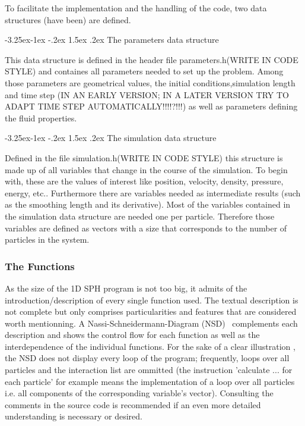 \documentclass{report}
\makeatletter
\renewcommand\paragraph{\@startsection{paragraph}{4}{\z@}%
  {-3.25ex\@plus -1ex \@minus -.2ex}%
  {1.5ex \@plus .2ex}%
  {\normalfont\normalsize\bfseries}}
\makeatother
\begin{document}
To facilitate the implementation and the handling of the code, two data structures (have been) are defined. 

\paragraph{The parameters data structure}

This data structure is defined in the header file parameters.h(WRITE IN CODE STYLE) and containes all parameters needed to set up the problem. Among those parameters are geometrical values, the initial conditions,simulation length and time step (IN AN EARLY VERSION; IN A LATER VERSION TRY TO ADAPT TIME STEP AUTOMATICALLY!!!!?!!!) as well as parameters defining the fluid properties.

\paragraph{The simulation data structure}

Defined in the file simulation.h(WRITE IN CODE STYLE) this structure is made up of all variables that change in the course of the simulation. To begin with, these are the values of interest like position, velocity, density, pressure, energy, etc.. Furthermore there are variables needed as intermediate results (such as the smoothing length and its derivative). 
Most of the variables contained in the simulation data structure are needed one per particle. Therefore those variables are defined as vectors with a size that corresponds to the number of particles in the system. 

\subsubsection{The Functions}

As the size of the 1D SPH program is not too big, it admits of the introduction/description of every single function used. The textual description is not complete but only comprises particularities and features that are considered worth mentionning. A Nassi-Schneidermann-Diagram (NSD)~\cite{Nassi1973} complements each description and shows the control flow for each function as well as the interdependence of the individual functions. For the sake of a clear illustration , the NSD does not display every loop of the program; frequently, loops over all particles and the interaction list are ommitted (the instruction 'calculate ... for each particle' for example means the implementation of a loop over all particles i.e. all components of the corresponding variable's vector).  Consulting the comments in the source code is recommended if an even more detailed understanding is necessary or desired.
\end{document}
